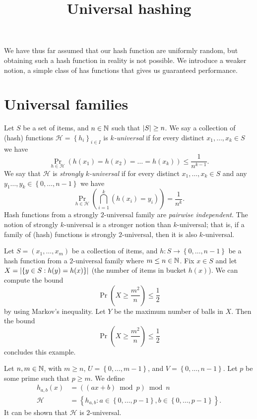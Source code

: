 \documentclass[a4paper]{article}
\begin{document}
\title{Universal hashing}
\maketitle

We have thus far assumed that our hash function are uniformly random,
but obtaining such a hash function in reality is not possible.
We introduce a weaker notion, a simple class of has functions that gives us 
guaranteed performance.

\section{Universal families}

Let $S$ be a set of items, and $n \in \mathbb{N}$ such that $\left\lvert S \right\rvert \geq n$.
We say a collection of (hash) functions
$\mathcal H = \left\{ h_i \right\}_{i \in I}$
is \emph{$k$-universal} if for every distinct 
$x_1, \ldots, x_k \in S$
we have
\[
	\Pr_{h \in \mathcal H}
	\left( 
		h(x_1) = h(x_2) = \ldots = h(x_k)
	 \right) \leq \frac{1}{n^{k-1}}.
\]
We say that $\mathcal H$ is \emph{strongly $k$-universal} if for every
distinct $x_1, \ldots, x_k \in S$ and any 
$y_1 \ldots, y_k \in \left\{ 0, \ldots, n-1 \right\}$ we have
\[
	\Pr_{h \in \mathcal H} \left( 
		\bigcap_{i=1}^k \left( h(x_i) = y_i \right)
	 \right)
	 = \frac1{n^k}.
\]
Hash functions from a strongly $2$-universal family are
\emph{pairwise independent}.
The notion of strongly $k$-universal is a stronger notion than $k$-universal;
that is, if a family of (hash) functions is strongly $2$-universal,
then it is also $k$-universal.

\begin{example}
	Let $S = (x_1, \ldots, x_m)$ be a collection of items, and 
	$h: S \to \left\{ 0, \ldots, n-1 \right\}$ be a hash function from a
	$2$-universal family where $m \leq n \in \mathbb{N}$.
	Fix $x \in S$ and let 
	$X = \left\lvert \left\{ y \in S: h(y) = h(x) \right\} \right\rvert$
	(the number of items in bucket $h(x)$).
	We can compute the bound
	\[\Pr\left( X \geq \frac{m^2}{n} \right) \leq \frac{1}{2}\]
	by using Markov's inequality.
	Let $Y$ be the maximum number of balls in $X$.
	Then the bound
	\[\Pr\left( X \geq \frac{m^2}{n} \right) \leq \frac{1}{2}\]
	concludes this example.
\end{example}

\begin{example}
	Let $n, m \in \mathbb{N}$, with $m \geq n$,
	$U = \left\{ 0, \ldots, m-1 \right\}$, and
	$V = \left\{ 0, \ldots, n-1 \right\}$.
	Let $p$ be some prime such that $p \geq m$.
	We define
	\begin{align*}
		h_{a,b}(x) &= \left( (ax + b) \bmod p \right) \bmod n \\
		\mathcal H &= \left\{ 
			h_{a,b}: 
			a \in \left\{ 0, \ldots, p-1 \right\},
			b \in \left\{ 0, \ldots, p-1 \right\}
		\right\}.
	\end{align*}
	It can be shown that $\mathcal H$ is $2$-universal.
\end{example}
\end{document}
